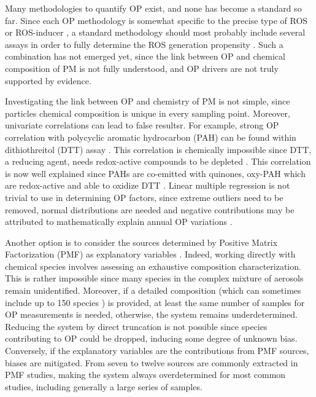 \documentclass[acp, manuscript]{copernicus}
\begin{document}
Many methodologies to quantify OP exist, and none has become a standard so far. Since each OP
methodology is somewhat specific to the precise type of ROS or ROS-inducer
\citep{yang_measurement_2014}, a standard methodology should most probably
include several assays in order to fully determine the ROS generation propensity
\citep{janssen_associations_2015,sauvain_comparison_2013}. Such a combination
has not emerged yet, since the link between OP and chemical composition of PM is
not fully understood, and OP drivers are not truly supported by evidence.

Investigating the link between OP and chemistry of PM is not simple, since
particles chemical composition is unique in every sampling point.  Moreover,
univariate correlations can lead to false resultsr. For example, strong OP
correlation with polycyclic aromatic hydrocarbon (PAH) can be found within
dithiothreitol (DTT) assay \citep{calas_comparison_2018}. This correlation is chemically
impossible since DTT, a reducing agent, needs redox-active compounds to be
depleted \citep{ntziachristos_relationship_2007,shirmohammadi_fine_2016}. This
correlation is now well explained since PAHs are co-emitted with quinones,
oxy-PAH which are redox-active and able to oxidize DTT
\citep{charrier_oxidant_2015,charrier_dithiothreitol_2012}. Linear multiple
regression is not trivial to use in determining OP factors, since extreme
outliers need to be removed, normal distributions are needed and negative
contributions may be attributed to mathematically explain annual OP variations
\citep{calas_comparison_2018}.

Another option is to consider the sources determined by Positive Matrix
Factorization (PMF) as explanatory variables \citep{bates_reactive_2015}.
Indeed, working directly with chemical species involves assessing an exhaustive
composition characterization. This is rather impossible since many species in
the complex mixture of aerosols remain unidentified.  Moreover, if a detailed
composition (which can sometimes include up to 150 species
\citep{waked_source_2014}) is provided, at least the same number of samples for
OP measurements is needed, otherwise, the system remains underdetermined.
Reducing the system by direct truncation is not possible since species
contributing to OP could be dropped, inducing some degree of unknown bias.
Conversely, if the explanatory variables are the contributions from PMF sources,
biases are mitigated. From seven to twelve sources are commonly extracted in PMF
studies, making the system always overdetermined for most common studies,
including generally a large series of samples.
\end{document}
